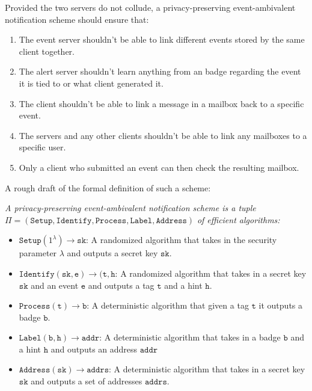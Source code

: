 Provided the two servers do not collude, a privacy-preserving event-ambivalent
notification scheme should ensure that:\par
\begin{enumerate}
  \item The event server shouldn't be able to link different events stored by the
    same client together.
  \item The alert server shouldn't learn anything from an badge regarding the
    event it is tied to or what client generated it.
  \item The client shouldn't be able to link a message in a mailbox back to a
    specific event.
  \item The servers and any other clients shouldn't be able to link any mailboxes
    to a specific user.
  \item Only a client who submitted an event can then check the resulting mailbox.
\end{enumerate}

A rough draft of the formal definition of such a scheme:\par

\begin{define}
\label{define:model}
  
  \emph{A privacy-preserving event-ambivalent notification scheme is a tuple}\\
  $\Pi = \mathtt{(Setup, Identify, Process, Label, Address)}$ \emph{of efficient
  algorithms:}
  
  \begin{itemize}
    
    \item $\mathtt{Setup}(1^\lambda) \to \mathtt{sk}$: A randomized algorithm
      that takes in the security parameter $\lambda$ and outputs a secret key
      $\mathtt{sk}$.

    \item $\mathtt{Identify}(\mathtt{sk, e}) \to (\mathtt{t, h}$: A
      randomized algorithm that takes in a secret key $\mathtt{sk}$ and an
      event $\mathtt{e}$ and outputs a tag $\mathtt{t}$ and a hint
      $\mathtt{h}$.

    \item $\mathtt{Process}(\mathtt{t}) \to \mathtt{b}$: A deterministic
      algorithm that given a tag $\mathtt{t}$ it outputs a badge $\mathtt{b}$.
    
    \item $\mathtt{Label}(\mathtt{b, h}) \to \mathtt{addr}$: A deterministic
      algorithm that takes in a badge $\mathtt{b}$ and a hint $\mathtt{h}$
      and outputs an address $\mathtt{addr}$

    \item $\mathtt{Address}(\mathtt{sk}) \to \mathtt{addrs}$: A deterministic
      algorithm that takes in a secret key $\mathtt{sk}$ and outputs a set of
      addresses $\mathtt{addrs}$.
  
  \end{itemize}

\end{define}

